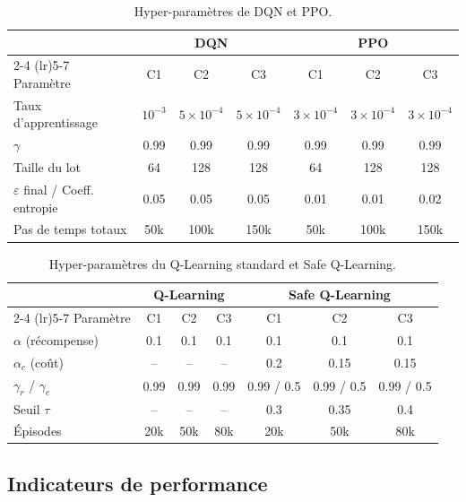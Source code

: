 \documentclass{article}
\begin{document}
\begin{table}[H]
\centering
\caption{Hyper-paramètres de DQN et PPO.}
\label{tab:dqn_params}
\small
\begin{tabular}{lcccccc}
\toprule
 & \multicolumn{3}{c}{\textbf{DQN}} & \multicolumn{3}{c}{\textbf{PPO}} \\
\cmidrule(lr){2-4} \cmidrule(lr){5-7}
Paramètre & C1 & C2 & C3 & C1 & C2 & C3 \\
\midrule
Taux d'apprentissage & $10^{-3}$ & $5{\times}10^{-4}$ & $5{\times}10^{-4}$ & $3{\times}10^{-4}$ & $3{\times}10^{-4}$ & $3{\times}10^{-4}$ \\
$\gamma$ & 0.99 & 0.99 & 0.99 & 0.99 & 0.99 & 0.99 \\
Taille du lot & 64 & 128 & 128 & 64 & 128 & 128 \\
$\varepsilon$ final / Coeff. entropie & 0.05 & 0.05 & 0.05 & 0.01 & 0.01 & 0.02 \\
Pas de temps totaux & 50k & 100k & 150k & 50k & 100k & 150k \\
\bottomrule
\end{tabular}
\end{table}

\begin{table}[H]
\centering
\caption{Hyper-paramètres du Q-Learning standard et Safe Q-Learning.}
\label{tab:safe_ql_params}
\small
\begin{tabular}{lcccccc}
\toprule
 & \multicolumn{3}{c}{\textbf{Q-Learning}} & \multicolumn{3}{c}{\textbf{Safe Q-Learning}} \\
\cmidrule(lr){2-4} \cmidrule(lr){5-7}
Paramètre & C1 & C2 & C3 & C1 & C2 & C3 \\
\midrule
$\alpha$ (récompense) & 0.1 & 0.1 & 0.1 & 0.1 & 0.1 & 0.1 \\
$\alpha_c$ (coût) & -- & -- & -- & 0.2 & 0.15 & 0.15 \\
$\gamma_r$ / $\gamma_c$ & 0.99 & 0.99 & 0.99 & 0.99 / 0.5 & 0.99 / 0.5 & 0.99 / 0.5 \\
Seuil $\tau$ & -- & -- & -- & 0.3 & 0.35 & 0.4 \\
Épisodes & 20k & 50k & 80k & 20k & 50k & 80k \\
\bottomrule
\end{tabular}
\end{table}

\subsection{Indicateurs de performance}
\end{document}

